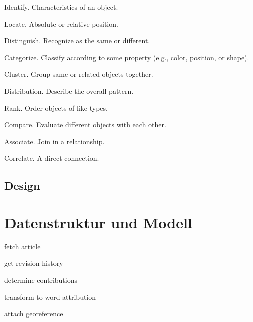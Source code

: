 \begin{todos}
    \item {}
    \item Identify. Characteristics of an object.
    \item Locate. Absolute or relative position.
    \item Distinguish. Recognize as the same or different.
    \item Categorize. Classify according to some property (e.g., color, position, or shape).
    \item Cluster. Group same or related objects together.
    \item Distribution. Describe the overall pattern.
    \item Rank. Order objects of like types.
    \item Compare. Evaluate different objects with each other.
    \item Associate. Join in a relationship.
    \item Correlate. A direct connection.
\end{todos}


\subsection{Design}


\section{Datenstruktur und Modell}

\begin{todos}
    \item fetch article
    \item get revision history
    \item determine contributions
    \item transform to word attribution
    \item attach georeference 
\end{todos}


